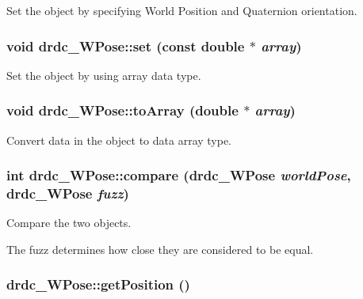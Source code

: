 Set the object by specifying World Position and Quaternion orientation. 

\hypertarget{classdrdc__WPose_8f6641d88dd366dfb3c6a560c11f0285}{
\subsubsection[set]{\setlength{\rightskip}{0pt plus 5cm}void drdc\_\-WPose::set (const double $\ast$ {\em array})}}
\label{classdrdc__WPose_8f6641d88dd366dfb3c6a560c11f0285}


Set the object by using array data type. 

\hypertarget{classdrdc__WPose_93914a9d20c6e13a4a0000b7532cda59}{
\subsubsection[toArray]{\setlength{\rightskip}{0pt plus 5cm}void drdc\_\-WPose::toArray (double $\ast$ {\em array})}}
\label{classdrdc__WPose_93914a9d20c6e13a4a0000b7532cda59}


Convert data in the object to data array type. 

\hypertarget{classdrdc__WPose_f61738b76e8b0f77f72b54c118e667c4}{
\subsubsection[compare]{\setlength{\rightskip}{0pt plus 5cm}int drdc\_\-WPose::compare ({\bf drdc\_\-WPose} {\em worldPose}, \/  {\bf drdc\_\-WPose} {\em fuzz})}}
\label{classdrdc__WPose_f61738b76e8b0f77f72b54c118e667c4}


Compare the two objects. 

The fuzz determines how close they are considered to be equal. \hypertarget{classdrdc__WPose_5467f7210d14c9622e938bb0ffbfdb34}{
\subsubsection[getPosition]{ drdc\_\-WPose::getPosition ()}}
\label{classdrdc__WPose_5467f7210d14c9622e938bb0ffbfdb34}


